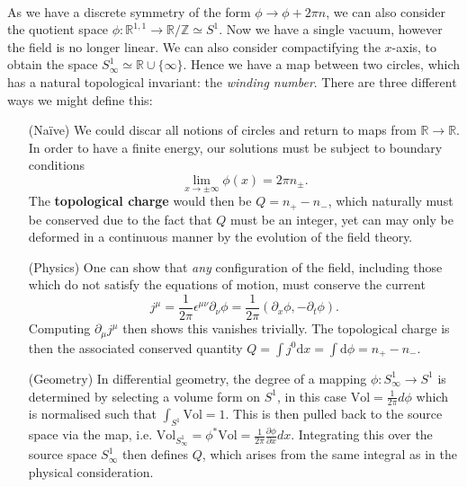 \documentclass[11pt, fleqn]{article}
\begin{document}
\paragraph{} As we have a discrete symmetry of the form $ \phi \to \phi + 2 \pi n $, we can also consider the quotient space $ \phi : \mathbb{R}^{1,1} \to \mathbb{R}/\mathbb{Z} \simeq S^1 $. Now we have a single vacuum, however the field is no longer linear. We can also consider compactifying the $ x $-axis, to obtain the space $ S^1_\infty \simeq \mathbb{R} \cup \{ \infty \} $. Hence we have a map between two circles, which has a natural topological invariant: the \textit{winding number}. There are three different ways we might define this:
	\begin{itemize}
		\item [(Na\"ive)] We could discar all notions of circles and return to maps from $ \mathbb{R} \to \mathbb{R} $. In order to have a finite energy, our solutions must be subject to boundary conditions	
			\begin{equation}\label{key}
				\lim_{x \to \pm \infty} \phi (x) = 2 \pi n_\pm.
			\end{equation}
		The \textbf{topological charge} would then be $ Q = n_+ - n_- $, which naturally must be conserved due to the fact that $ Q $ must be an integer, yet can may only be deformed in a continuous manner by the evolution of the field theory.
		
		\item[(Physics)] One can show that \textit{any} configuration of the field, including those which do not satisfy the equations of motion, must conserve the current
			\begin{equation}\label{key}
				j^\mu = \frac{1}{2 \pi} \epsilon^{\mu\nu} \partial_\nu \phi = \frac{1}{2 \pi} (\partial_x \phi, - \partial_t \phi).
			\end{equation}
		Computing $ \partial_\mu j^\mu $ then shows this vanishes trivially. The topological charge is then the associated conserved quantity $ Q = \int j^0 \mathrm{d}x = \int \mathrm{d}\phi = n_+ - n_- $.
		
		\item[(Geometry)] In differential geometry, the degree of a mapping $ \phi: S^1_\infty \to S^1 $ is determined by selecting a volume form on $ S^1 $, in this case $ \mathrm{Vol} = \tfrac{1}{2 \pi} d\phi $ which is normalised such that $ \int_{S^1} \mathrm{Vol} = 1 $. This is then pulled back to the source space via the map, i.e. $ \mathrm{Vol}_{S^1_\infty} = \phi^* \mathrm{Vol} = \tfrac{1}{2 \pi} \tfrac{\partial \phi}{\partial x} dx$. Integrating this over the source space $ S^1_\infty $ then defines $ Q $, which arises from the same integral as in the physical consideration.
	\end{itemize}
\end{document}
